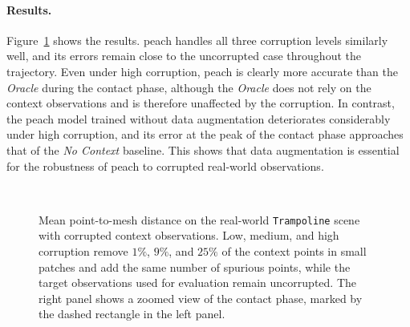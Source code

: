 \paragraph{Results.}
Figure~\ref{fig:corruption} shows the results. \gls{peach} handles all three corruption levels similarly well, and its errors remain close to the uncorrupted case throughout the trajectory. Even under high corruption, \gls{peach} is clearly more accurate than the \textit{Oracle} during the contact phase, although the \textit{Oracle} does not rely on the context observations and is therefore unaffected by the corruption. In contrast, the \gls{peach} model trained without data augmentation deteriorates considerably under high corruption, and its error at the peak of the contact phase approaches that of the \textit{No Context} baseline. This shows that data augmentation is essential for the robustness of \gls{peach} to corrupted real-world observations.

\begin{figure}[t]
    \centering
    \makebox[\textwidth][c]{}\\[-2mm]
    
    \caption{Mean point-to-mesh distance on the real-world \texttt{Trampoline} scene with corrupted context observations. Low, medium, and high corruption remove $1\%$, $9\%$, and $25\%$ of the context points in small patches and add the same number of spurious points, while the target observations used for evaluation remain uncorrupted. The right panel shows a zoomed view of the contact phase, marked by the dashed rectangle in the left panel.}
    \label{fig:corruption}
\end{figure}